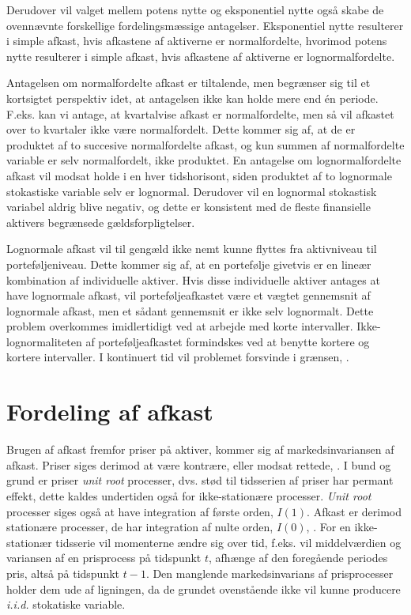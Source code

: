 \documentclass[
  a4paper,
  oneside]{memoir}
\begin{document}
Derudover vil valget mellem potens nytte og eksponentiel nytte også skabe de ovennævnte forskellige fordelingsmæssige antagelser. Eksponentiel nytte resulterer i simple afkast, hvis afkastene af aktiverne er normalfordelte, hvorimod potens nytte resulterer i simple afkast, hvis afkastene af aktiverne er lognormalfordelte.

Antagelsen om normalfordelte afkast er tiltalende, men begrænser sig til et kortsigtet perspektiv idet, at antagelsen ikke kan holde mere end én periode. F.eks. kan vi antage, at kvartalvise afkast er normalfordelte, men så vil afkastet over to kvartaler ikke være normalfordelt. Dette kommer sig af, at de er produktet af to succesive normalfordelte afkast, og kun summen af normalfordelte variable er selv normalfordelt, ikke produktet. En antagelse om lognormalfordelte afkast vil modsat holde i en hver tidshorisont, siden produktet af to lognormale stokastiske variable selv er lognormal. Derudover vil en lognormal stokastisk variabel aldrig blive negativ, og dette er konsistent med de fleste finansielle aktivers begrænsede gældsforpligtelser.

Lognormale afkast vil til gengæld ikke nemt kunne flyttes fra aktivniveau til porteføljeniveau. Dette kommer sig af, at en portefølje givetvis er en lineær kombination af individuelle aktiver. Hvis disse individuelle aktiver antages at have lognormale afkast, vil porteføljeafkastet være et vægtet gennemsnit af lognormale afkast, men et sådant gennemsnit er ikke selv lognormalt. Dette problem overkommes imidlertidigt ved at arbejde med korte intervaller. Ikke-lognormaliteten af porteføljeafkastet formindskes ved at benytte kortere og kortere intervaller. I kontinuert tid vil problemet forsvinde i grænsen, \citep{CampVic2003}.

\hypertarget{fordafafk}{%
\section{Fordeling af afkast}\label{fordafafk}}

Brugen af afkast fremfor priser på aktiver, kommer sig af markedsinvariansen af afkast. Priser siges derimod at være kontrære, eller modsat rettede, \citep{Jondeau2007}. I bund og grund er priser \emph{unit root} processer, dvs. stød til tidsserien af priser har permant effekt, dette kaldes undertiden også for ikke-stationære processer. \emph{Unit root} processer siges også at have integration af første orden, \(I(1)\). Afkast er derimod stationære processer, de har integration af nulte orden, \(I(0)\), \citep{Verbeek2017}. For en ikke-stationær tidsserie vil momenterne ændre sig over tid, f.eks. vil middelværdien og variansen af en prisprocess på tidspunkt \(t\), afhænge af den foregående periodes pris, altså på tidspunkt \(t-1\). Den manglende markedsinvarians af prisprocesser holder dem ude af ligningen, da de grundet ovenstående ikke vil kunne producere \emph{i.i.d.} stokatiske variable.
\end{document}
